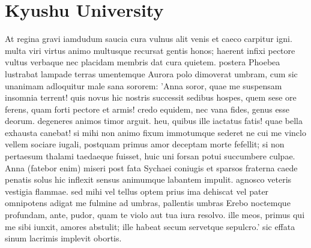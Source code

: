 \section{Kyushu University}
At regina gravi iamdudum saucia cura
vulnus alit venis et caeco carpitur igni.
multa viri virtus animo multusque recursat
gentis honos; haerent infixi pectore vultus
verbaque nec placidam membris dat cura quietem.       
postera Phoebea lustrabat lampade terras
umentemque Aurora polo dimoverat umbram,
cum sic unanimam adloquitur male sana sororem:
'Anna soror, quae me suspensam insomnia terrent!
quis novus hic nostris successit sedibus hospes,         
quem sese ore ferens, quam forti pectore et armis!
credo equidem, nec vana fides, genus esse deorum.
degeneres animos timor arguit. heu, quibus ille
iactatus fatis! quae bella exhausta canebat!
si mihi non animo fixum immotumque sederet              
ne cui me vinclo vellem sociare iugali,
postquam primus amor deceptam morte fefellit;
si non pertaesum thalami taedaeque fuisset,
huic uni forsan potui succumbere culpae.
Anna (fatebor enim) miseri post fata Sychaei           
coniugis et sparsos fraterna caede penatis
solus hic inflexit sensus animumque labantem
impulit. agnosco veteris vestigia flammae.
sed mihi vel tellus optem prius ima dehiscat
vel pater omnipotens adigat me fulmine ad umbras,         
pallentis umbras Erebo noctemque profundam,
ante, pudor, quam te violo aut tua iura resolvo.
ille meos, primus qui me sibi iunxit, amores
abstulit; ille habeat secum servetque sepulcro.'
sic effata sinum lacrimis implevit obortis.       
